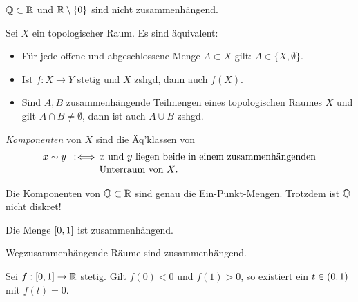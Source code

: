 \documentclass{cheat-sheet}
\begin{document}
\begin{bspe}
  $\mathbb{Q} \subset \mathbb{R}$ und $\mathbb{R} \setminus \{ 0 \}$ sind nicht zusammenhängend.
\end{bspe}

\begin{prop}
  Sei $X$ ein topologischer Raum. Es sind äquivalent:
  \begin{itemize}
    \item Für jede offene und abgeschlossene Menge $A \subset X$ gilt: $A \in \{ X, \emptyset \}$.
  \end{itemize}
\end{prop}

\begin{prop}
  \begin{itemize}
    \item Ist $f : X \to Y$ stetig und $X$ zshgd, dann auch $f(X)$.
    \item Sind $A, B$ zusammenhängende Teilmengen eines topologischen Raumes $X$ und gilt $A \cap B \not= \emptyset$, dann ist auch $A \cup B$ zshgd.
  \end{itemize}
\end{prop}

\begin{defn}
  \emph{Komponenten} von $X$ sind die Äq'klassen von
  \begin{align*}
    x \sim y \enspace:\!\iff \, &\text{$x$ und $y$ liegen beide in einem zusammenhängenden}\\[-2pt]
    &\text{Unterraum von $X$.}
  \end{align*}
\end{defn}

\begin{bsp}
  Die Komponenten von $\mathbb{Q} \subset \mathbb{R}$ sind genau die Ein-Punkt-Mengen. Trotzdem ist $\mathbb{Q}$ nicht diskret!
\end{bsp}

\begin{prop}
  Die Menge $\left[ 0, 1 \right]$ ist zusammenhängend.
\end{prop}

\begin{kor}
  Wegzusammenhängende Räume sind zusammenhängend.
\end{kor}

\begin{prop}[ZWS]
  Sei $f : \left[ 0, 1 \right] \to \mathbb{R}$ stetig. Gilt $f(0) < 0$ und $f(1) > 0$, so existiert ein $t \in \left( 0, 1 \right)$ mit $f(t) = 0$.
\end{prop}
\end{document}
